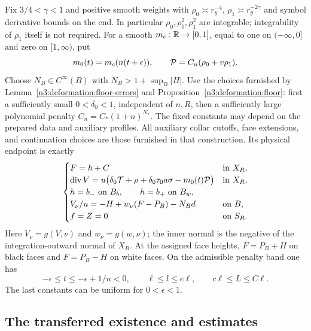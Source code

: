 Fix $3/4<\gamma<1$ and positive smooth weights with
$\rho_0\asymp r_y^{-4}$, $\rho_1\asymp r_y^{-2\gamma}$ and
symbol derivative bounds on the end.  In particular
$\rho_0,\rho_0^2,\rho_1^2$ are integrable; integrability of
$\rho_1$ itself is not required.  For a smooth
$m_c:\mathbb R\to[0,1]$, equal to one on $(-\infty,0]$ and zero on
$[1,\infty)$, put
\[
 m_0(t)=m_c(n(t+\epsilon)),\qquad
 \mathcal P=C_n(\rho_0+v\rho_1).
\]
Choose $N_B\in C^\infty(B)$ with $N_B>1+\sup_B|H|$.
Use the choices furnished by Lemma~\ref{n3:deformation:floor-errors} and Proposition~\ref{n3:deformation:floor}:
first a sufficiently small $0<\delta_0<1$, independent of $n,R$,
then a sufficiently large polynomial penalty
$C_n=C_*(1+n)^{N_*}$.  The fixed constants may depend on the
prepared data and auxiliary profiles.  All auxiliary collar cutoffs,
face extensions, and continuation choices are those furnished in
that construction.  Its physical endpoint is exactly
\begin{equation}\label{ch:ell:system}
 \begin{cases}
 F=h+C &\text{in }X_R,\\
 \operatorname{div} V=u\bigl(\delta_0\mathcal T+\rho+
           \delta_0\tau_0a\sigma-m_0(t)\mathcal P\bigr)
       &\text{in }X_R,\\
 h=b_-\ \text{on }B_b,\qquad h=b_+\ \text{on }B_w,\\
 V_\nu/u=-H+w_\nu(F-P_B)-N_Bd &\text{on }B,\\
 f=Z=0 &\text{on }S_R.
 \end{cases}
\end{equation}
Here $V_\nu=g(V,\nu)$ and $w_\nu=g(w,\nu)$; the inner normal
is the negative of the integration-outward normal of $X_R$.
At the assigned face heights,
$F=P_B+H$ on black faces and $F=P_B-H$ on white faces.
On the admissible penalty band one has
\begin{equation}\label{ch:ell:floor-scale}
 -\epsilon\le t\le-\epsilon+1/n<0,
 \qquad \ell\le l\le e\ell,
 \qquad c\ell\le L\le C\ell.
\end{equation}
The last constants can be uniform for $0<\epsilon<1$.

\subsection{The transferred existence and estimates}

